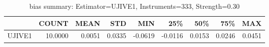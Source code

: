 \begin{table}[ht]
\centering
\caption{bias summary: Estimator=UJIVE1, Instruments=333, Strength=0.30}
\begin{tabular}{lrrrrrrrr}
\toprule
 & COUNT & MEAN & STD & MIN & 25\% & 50\% & 75\% & MAX \\
\midrule
UJIVE1 & 10.0000 & 0.0051 & 0.0335 & -0.0619 & -0.0116 & 0.0153 & 0.0246 & 0.0451 \\
\bottomrule
\end{tabular}
\end{table}
